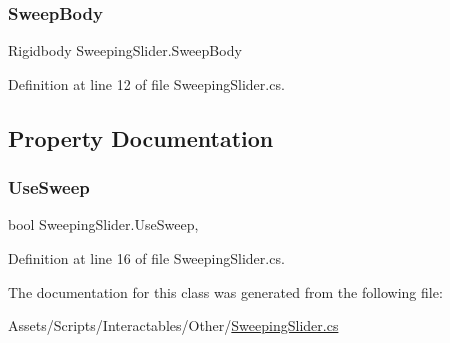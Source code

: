 \subsubsection{\texorpdfstring{Sweep\+Body}{SweepBody}}
{\footnotesize\ttfamily Rigidbody Sweeping\+Slider.\+Sweep\+Body}



Definition at line 12 of file Sweeping\+Slider.\+cs.



\subsection{Property Documentation}
\mbox{\label{class_sweeping_slider_a3def56a1e81ee06a67744cc00d5bd622}} 
\subsubsection{\texorpdfstring{Use\+Sweep}{UseSweep}}
{\footnotesize\ttfamily bool Sweeping\+Slider.\+Use\+Sweep\hspace{0.3cm}{\ttfamily [get]}, {\ttfamily [set]}}



Definition at line 16 of file Sweeping\+Slider.\+cs.



The documentation for this class was generated from the following file\+:\begin{DoxyCompactItemize}
\item 
Assets/\+Scripts/\+Interactables/\+Other/\mbox{\hyperlink{_sweeping_slider_8cs}{Sweeping\+Slider.\+cs}}\end{DoxyCompactItemize}
